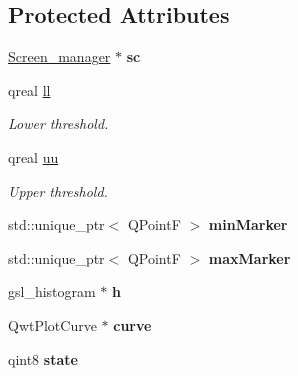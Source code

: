 \subsection*{Protected Attributes}
\begin{DoxyCompactItemize}
\item 
\mbox{\label{classBarScreen_a78c84b8c40247d7cb011424250d16ba5}} 
\mbox{\hyperlink{classScreen__manager}{Screen\+\_\+manager}} $\ast$ {\bfseries sc}
\item 
\mbox{\label{classBarScreen_a5d3193a8e27fd072ed67f069dac1640b}} 
qreal \mbox{\hyperlink{classBarScreen_a5d3193a8e27fd072ed67f069dac1640b}{ll}}
\begin{DoxyCompactList}\small\item\em Lower threshold. \end{DoxyCompactList}\item 
\mbox{\label{classBarScreen_a3b456d8140f716cfee488091c927d54f}} 
qreal \mbox{\hyperlink{classBarScreen_a3b456d8140f716cfee488091c927d54f}{uu}}
\begin{DoxyCompactList}\small\item\em Upper threshold. \end{DoxyCompactList}\item 
\mbox{\label{classBarScreen_a3d5a447b9895c22cf4e28ea041cef272}} 
std\+::unique\+\_\+ptr$<$ Q\+PointF $>$ {\bfseries min\+Marker}
\item 
\mbox{\label{classBarScreen_a80404aaebe17ccccf1918c8f7b59dc3e}} 
std\+::unique\+\_\+ptr$<$ Q\+PointF $>$ {\bfseries max\+Marker}
\item 
\mbox{\label{classBarScreen_a92a1082b85912224f43a4f2ea85aa289}} 
gsl\+\_\+histogram $\ast$ {\bfseries h}
\item 
\mbox{\label{classBarScreen_ad590da057a164a1d8a5339243165adf7}} 
Qwt\+Plot\+Curve $\ast$ {\bfseries curve}
\item 
\mbox{\label{classBarScreen_a760794dcf754291e8048d11b59f164c4}} 
qint8 {\bfseries state}
\item 
\mbox{\label{classBarScreen_ae1d1f7ad5265d8cab9cfb4508060d888}} 

\end{DoxyCompactItemize}
